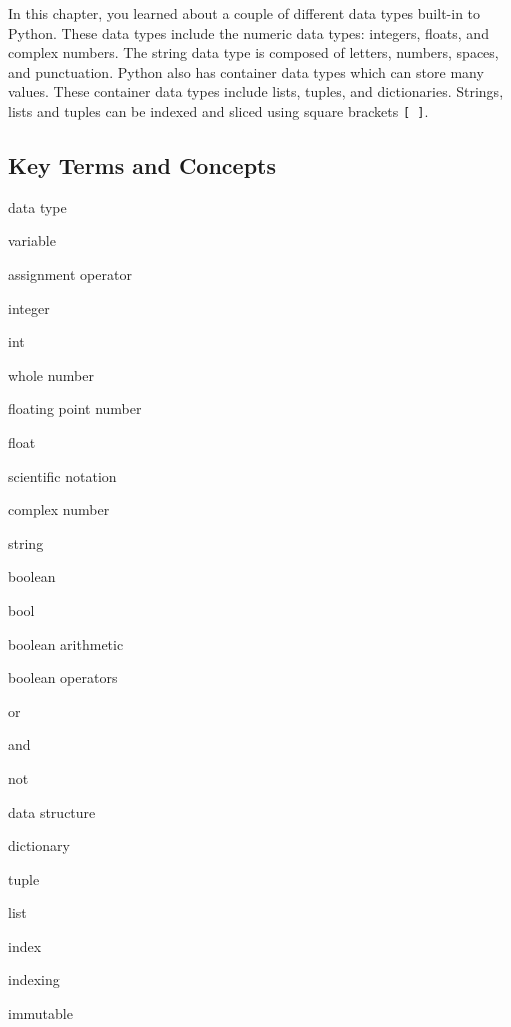 \documentclass{book}
\newenvironment{key_terms}{\begin{multicols}{3}}{\end{multicols}} %
\newcommand{\passthrough}[1]{#1}
\begin{document}
    




    
        In this chapter, you learned about a couple of different data types
built-in to Python. These data types include the numeric data types:
integers, floats, and complex numbers. The string data type is composed
of letters, numbers, spaces, and punctuation. Python also has container
data types which can store many values. These container data types
include lists, tuples, and dictionaries. Strings, lists and tuples can
be indexed and sliced using square brackets
\passthrough{\lstinline![ ]!}.
    




    
        \hypertarget{key-terms-and-concepts}{%
\subsection{Key Terms and Concepts}\label{key-terms-and-concepts}}
    




    
        \begin{key_terms}
        data type

variable

assignment operator

integer

int

whole number

floating point number

float

scientific notation

complex number

string

boolean

bool

boolean arithmetic

boolean operators

or

and

not

data structure

dictionary

tuple

list

index

indexing

immutable
        \end{key_terms}

    
\end{document}
